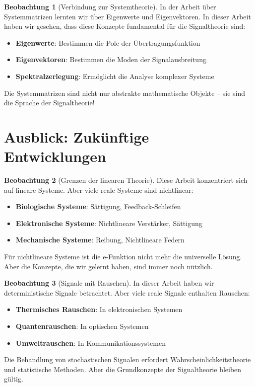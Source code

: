 ﻿\documentclass[a4paper,12pt]{report}
\theoremstyle{definition}
\newtheorem{beobachtung}{Beobachtung}
\begin{document}
	\begin{beobachtung}[Verbindung zur Systemtheorie]
		In der Arbeit über Systemmatrizen lernten wir über Eigenwerte und Eigenvektoren. In dieser Arbeit haben wir gesehen, dass diese Konzepte fundamental für die Signaltheorie sind:
		\begin{itemize}
			\item[-] \textbf{Eigenwerte}: Bestimmen die Pole der Übertragungsfunktion
			\item[-] \textbf{Eigenvektoren}: Bestimmen die Moden der Signalausbreitung
			\item[-] \textbf{Spektralzerlegung}: Ermöglicht die Analyse komplexer Systeme
		\end{itemize}
		
		Die Systemmatrizen sind nicht nur abstrakte mathematische Objekte -- sie sind die Sprache der Signaltheorie!
	\end{beobachtung}
	
	\section{Ausblick: Zukünftige Entwicklungen}
	
	\begin{beobachtung}[Grenzen der linearen Theorie]
		Diese Arbeit konzentriert sich auf lineare Systeme. Aber viele reale Systeme sind nichtlinear:
		\begin{itemize}
			\item[-] \textbf{Biologische Systeme}: Sättigung, Feedback-Schleifen
			\item[-] \textbf{Elektronische Systeme}: Nichtlineare Verstärker, Sättigung
			\item[-] \textbf{Mechanische Systeme}: Reibung, Nichtlineare Federn
		\end{itemize}
		
		Für nichtlineare Systeme ist die e-Funktion nicht mehr die universelle Lösung. Aber die Konzepte, die wir gelernt haben, sind immer noch nützlich.
	\end{beobachtung}
	
	\begin{beobachtung}[Signale mit Rauschen]
		In dieser Arbeit haben wir deterministische Signale betrachtet. Aber viele reale Signale enthalten Rauschen:
		\begin{itemize}
			\item[-] \textbf{Thermisches Rauschen}: In elektronischen Systemen
			\item[-] \textbf{Quantenrauschen}: In optischen Systemen
			\item[-] \textbf{Umweltrauschen}: In Kommunikationssystemen
		\end{itemize}
		
		Die Behandlung von stochastischen Signalen erfordert Wahrscheinlichkeitstheorie und statistische Methoden. Aber die Grundkonzepte der Signaltheorie bleiben gültig.
	\end{beobachtung}
	
\end{document}
